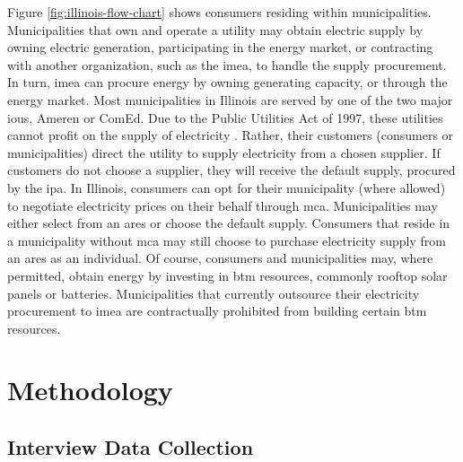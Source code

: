 Figure \ref{fig:illinois-flow-chart} shows consumers residing within
municipalities. Municipalities that own and operate a utility may obtain
electric supply by owning electric generation, participating in the energy
market, or contracting with another organization, such as the \ac{imea}, to
handle the supply procurement. In turn, \ac{imea} can procure energy by owning
generating capacity, or through the energy market. Most municipalities in
Illinois are served by one of the two major \acp{iou}, Ameren or ComEd. Due to
the Public Utilities Act of 1997, these utilities cannot profit on the supply of
electricity \cite{illinois_90th_general_assembly_electric_1997}. Rather, their
customers (consumers or municipalities) direct the utility to supply electricity
from a chosen supplier. If customers do not choose a supplier, they will receive
the default supply, procured by the \ac{ipa}. In Illinois, consumers can opt for
their municipality (where allowed) to negotiate electricity prices on their
behalf through \ac{mca}. Municipalities may either select from an \ac{ares} or
choose the default supply. Consumers that reside in a municipality without
\ac{mca} may still choose to purchase electricity supply from an \ac{ares} as an
individual. Of course, consumers and municipalities may, where permitted, obtain
energy by investing in \ac{btm} resources, commonly rooftop solar panels or
batteries. Municipalities that currently outsource their electricity procurement
to \ac{imea} are contractually prohibited from building certain \ac{btm}
resources.
 

\section{Methodology}
\label{section:interview-methods}

\subsection{Interview Data Collection}

